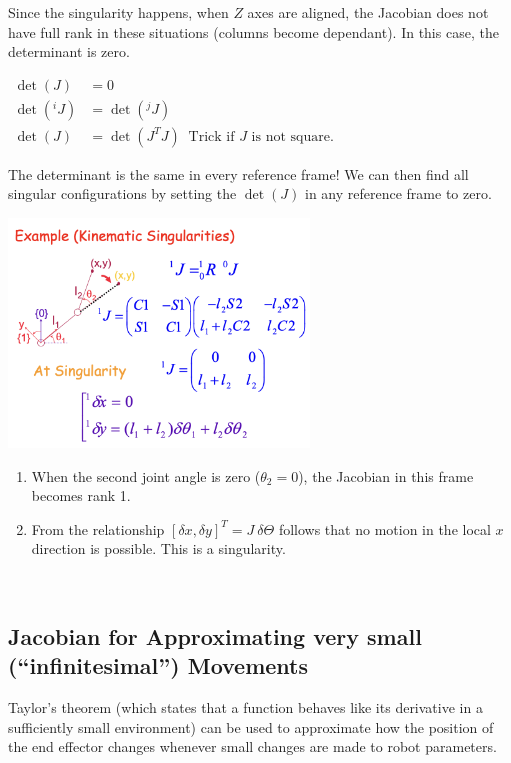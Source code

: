 Since the singularity happens, when $Z$ axes are aligned, the Jacobian does not have full rank in these situations (columns become dependant). In this case, the determinant is zero.
\begin{center}
	$
	\begin{aligned}
		 \det(J)&=0 \\
		 \det({}^i J)&=\det({}^j J)\\
		 \det(J)&=\det(J^T J)\ \text{   Trick if $J$ is not square.}
	\end{aligned}
	$
\end{center}
The determinant is the same in every reference frame! We can then find all singular configurations by setting the $\det(J)$ in any reference frame to zero.\\

\begin{minipage}[c]{0.5\textwidth}
	\includegraphics[width=8cm]{sections/imgs/4_kinematic_singularities.png}
\end{minipage}
\hfill
\begin{minipage}[c]{0.5\textwidth}
	\begin{center}
	\begin{enumerate}
		\item When the second joint angle is zero ($\theta_2=0$), the Jacobian in this frame becomes rank 1.
		\item From the relationship $[\delta x, \delta y]^T = J \ \delta\Theta$ follows that no motion in the local $x$ direction is possible. This is a singularity.
	\end{enumerate}
	\end{center}
\end{minipage}\\

\subsection{Jacobian for Approximating very small (``infinitesimal'') Movements}
Taylor's theorem (which states that a function behaves like its derivative in a sufficiently small environment) can be used to approximate how the position of the end effector changes whenever small changes are made to robot parameters. 

